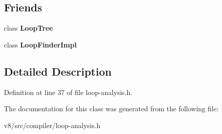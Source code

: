 \subsection*{Friends}
\begin{DoxyCompactItemize}
\item 
\mbox{\label{classv8_1_1internal_1_1compiler_1_1LoopTree_1_1Loop_aca571347144988d4e91401506c0faf91}} 
class {\bfseries Loop\+Tree}
\item 
\mbox{\label{classv8_1_1internal_1_1compiler_1_1LoopTree_1_1Loop_a7c3aef85599c6822d83a965a321dfbc3}} 
class {\bfseries Loop\+Finder\+Impl}
\end{DoxyCompactItemize}


\subsection{Detailed Description}


Definition at line 37 of file loop-\/analysis.\+h.



The documentation for this class was generated from the following file\+:\begin{DoxyCompactItemize}
\item 
v8/src/compiler/loop-\/analysis.\+h\end{DoxyCompactItemize}
